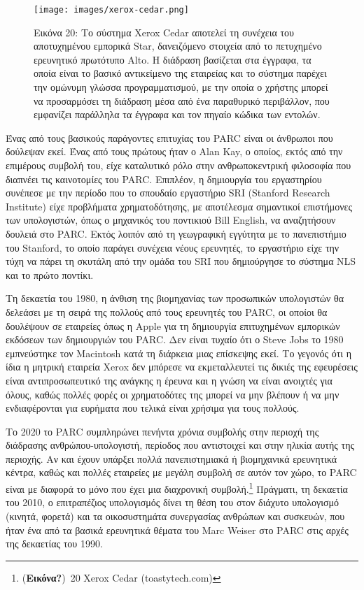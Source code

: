 \documentclass[
]{article}
\begin{document}
\leavevmode{}%
\begin{figure}
\hypertarget{fig:xerox-cedar}{%
\centering
\texttt{[image: images/xerox-cedar.png]}
\caption{Εικόνα 20: Το σύστημα Xerox Cedar αποτελεί τη συνέχεια του
αποτυχημένου εμπορικά Star, δανειζόμενο στοιχεία από το πετυχημένο
ερευνητικό πρωτότυπο Alto. Η διάδραση βασίζεται στα έγγραφα, τα οποία
είναι το βασικό αντικείμενο της εταιρείας και το σύστημα παρέχει την
ομώνυμη γλώσσα προγραμματισμού, με την οποία ο χρήστης μπορεί να
προσαρμόσει τη διάδραση μέσα από ένα παραθυρικό περιβάλλον, που
εμφανίζει παράλληλα τα έγγραφα και τον πηγαίο κώδικα των
εντολών.}\label{fig:xerox-cedar}
}
\end{figure}

Ένας από τους βασικούς παράγοντες επιτυχίας του PARC είναι οι άνθρωποι
που δούλεψαν εκεί. Ένας από τους πρώτους ήταν ο Alan Kay, ο οποίος,
εκτός από την επιμέρους συμβολή του, είχε καταλυτικό ρόλο στην
ανθρωποκεντρική φιλοσοφία που διαπνέει τις καινοτομίες του PARC.
Επιπλέον, η δημιουργία του εργαστηρίου συνέπεσε με την περίοδο που το
σπουδαίο εργαστήριο SRI (Stanford Research Institute) είχε προβλήματα
χρηματοδότησης, με αποτέλεσμα σημαντικοί επιστήμονες των υπολογιστών,
όπως ο μηχανικός του ποντικιού Bill English, να αναζητήσουν δουλειά στο
PARC. Εκτός λοιπόν από τη γεωγραφική εγγύτητα με το πανεπιστήμιο του
Stanford, το οποίο παράγει συνέχεια νέους ερευνητές, το εργαστήριο είχε
την τύχη να πάρει τη σκυτάλη από την ομάδα του SRI που δημιούργησε το
σύστημα NLS και το πρώτο ποντίκι.

Τη δεκαετία του 1980, η άνθιση της βιομηχανίας των προσωπικών
υπολογιστών θα δελεάσει με τη σειρά της πολλούς από τους ερευνητές του
PARC, οι οποίοι θα δουλέψουν σε εταιρείες όπως η Apple για τη δημιουργία
επιτυχημένων εμπορικών εκδόσεων των δημιουργιών του PARC. Δεν είναι
τυχαίο ότι ο Steve Jobs το 1980 εμπνεύστηκε τον Macintosh κατά τη
διάρκεια μιας επίσκεψης εκεί. Το γεγονός ότι η ίδια η μητρική εταιρεία
Xerox δεν μπόρεσε να εκμεταλλευτεί τις δικιές της εφευρέσεις είναι
αντιπροσωπευτικό της ανάγκης η έρευνα και η γνώση να είναι ανοιχτές για
όλους, καθώς πολλές φορές οι χρηματοδότες της μπορεί να μην βλέπουν ή να
μην ενδιαφέρονται για ευρήματα που τελικά είναι χρήσιμα για τους
πολλούς.

Το 2020 το PARC συμπληρώνει πενήντα χρόνια συμβολής στην περιοχή της
διάδρασης ανθρώπου-υπολογιστή, περίοδος που αντιστοιχεί και στην ηλικία
αυτής της περιοχής. Αν και έχουν υπάρξει πολλά πανεπιστημιακά ή
βιομηχανικά ερευνητικά κέντρα, καθώς και πολλές εταιρείες με μεγάλη
συμβολή σε αυτόν τον χώρο, το PARC είναι με διαφορά το μόνο που έχει μια
διαχρονική συμβολή.\footnote{(\textbf{Εικόνα?})~20 Xerox Cedar
  (toastytech.com)} Πράγματι, τη δεκαετία του 2010, ο επιτραπέζιος
υπολογισμός δίνει τη θέση του στον διάχυτο υπολογισμό (κινητά, φορετά)
και τα οικοσυστημάτα συνεργασίας ανθρώπων και συσκευών, που ήταν ένα από
τα βασικά ερευνητικά θέματα του Marc Weiser στο PARC στις αρχές της
δεκαετίας του 1990.
\end{document}
